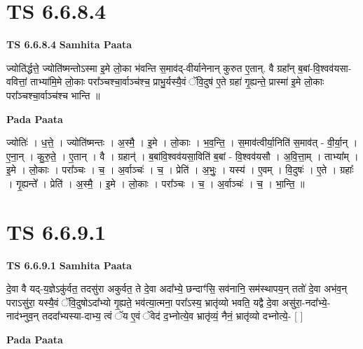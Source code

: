 \documentclass[17pt]{extarticle}
\begin{document}
\section*{ TS 6.6.8.4 }

\textbf{TS 6.6.8.4 } \newline
\textbf{Samhita Paata} \newline

ज्योति॑र्द्धत्ते॒ ज्योति॑ष्मन्तोऽस्मा इ॒मे लो॒का भ॑वन्ति स॒माव॑द्-वीर्यानेनान् कुरुत ए॒तान्. वै ग्रहा᳚न् ब॒बां-वि॒श्वव॑यसा-ववित्तां॒ ताभ्या॑मि॒मे लो॒काः परा᳚ञ्चश्चा॒र्वाञ्च॑श्च॒ प्राभु॒र्यस्यै॒वं ॅवि॒दुष॑ ए॒ते ग्रहा॑ गृ॒ह्यन्ते॒ प्रास्मा॑ इ॒मे लो॒काः परा᳚ञ्चश्चा॒र्वाञ्च॑श्च भान्ति ॥ \newline

\textbf{Pada Paata} \newline

ज्योतिः॑ । ध॒त्ते॒ । ज्योति॑ष्मन्तः । अ॒स्मै॒ । इ॒मे । लो॒काः । भ॒व॒न्ति॒ । स॒माव॑त्वीर्या॒निति॑ स॒माव॑त् - वी॒र्या॒न् । ए॒ना॒न् । कु॒रु॒ते॒ । ए॒तान् । वै । ग्रहान्॑ । ब॒बांवि॒श्वव॑यसा॒विति॑ ब॒बां - वि॒श्वव॑यसौ । अ॒वि॒त्ता॒म् । ताभ्या᳚म् । इ॒मे । लो॒काः । परा᳚ञ्चः । च॒ । अ॒र्वाञ्चः॑ । च॒ । प्रेति॑ । अ॒भुः॒ । यस्य॑ । ए॒वम् । वि॒दुषः॑ । ए॒ते । ग्रहाः᳚ । गृ॒ह्यन्ते᳚ । प्रेति॑ । अ॒स्मै॒ । इ॒मे । लो॒काः । परा᳚ञ्चः । च॒ । अ॒र्वाञ्चः॑ । च॒ । भा॒न्ति॒ ॥  \newline




\section*{ TS 6.6.9.1 }

\textbf{TS 6.6.9.1 } \newline
\textbf{Samhita Paata} \newline

दे॒वा वै यद्-य॒ज्ञेऽकु॑र्वत॒ तदसु॑रा अकुर्वत॒ ते दे॒वा अदा᳚भ्ये॒ छन्दाꣳ॑सि॒ सव॑नानि॒ सम॑स्थापय॒न् ततो॑ दे॒वा अभ॑व॒न् पराऽसु॑रा॒ यस्यै॒वं ॅवि॒दुषोऽदा᳚भ्यो गृ॒ह्यते॒ भव॑त्या॒त्मना॒ परा᳚ऽस्य॒ भ्रातृ॑व्यो भवति॒ यद्वै दे॒वा असु॑रा॒-नदा᳚भ्ये॒-नाद॑भ्नुव॒न् तददा᳚भ्यस्या-दाभ्य॒ त्वं ॅय ए॒वं ॅवेद॑ द॒भ्नोत्ये॒व भ्रातृ॑व्यं॒ नैनं॒ भ्रातृ॑व्यो दभ्नोत्ये॒- [  ] \newline

\textbf{Pada Paata} \newline
\end{document}
